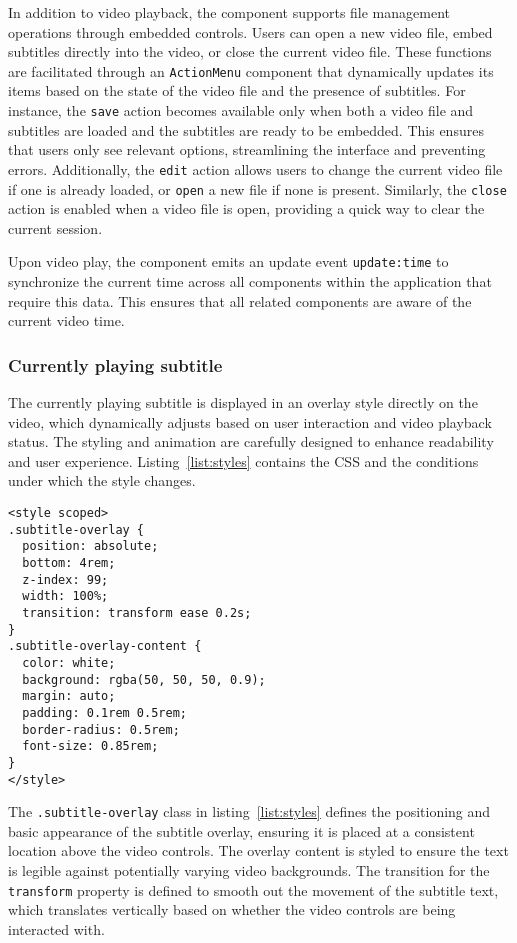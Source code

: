 In addition to video playback, the component supports file management operations through embedded controls. Users can open a new video file, embed subtitles directly into the video, or close the current video file. These functions are facilitated through an \texttt{ActionMenu} component that dynamically updates its items based on the state of the video file and the presence of subtitles. For instance, the \texttt{save} action becomes available only when both a video file and subtitles are loaded and the subtitles are ready to be embedded. This ensures that users only see relevant options, streamlining the interface and preventing errors. Additionally, the \texttt{edit} action allows users to change the current video file if one is already loaded, or \texttt{open} a new file if none is present. Similarly, the \texttt{close} action is enabled when a video file is open, providing a quick way to clear the current session.

Upon video play, the component emits an update event \texttt{update:time} to synchronize the current time across all components within the application that require this data. This ensures that all related components are aware of the current video time.

\subsubsection{Currently playing subtitle}

The currently playing subtitle is displayed in an overlay style directly on the video, which dynamically adjusts based on user interaction and video playback status. The styling and animation are carefully designed to enhance readability and user experience. Listing~\ref{list:styles} contains the CSS and the conditions under which the style changes.

\begin{clisting}
\label{list:styles}
\begin{verbatim}
<style scoped>
.subtitle-overlay {
  position: absolute;
  bottom: 4rem;
  z-index: 99;
  width: 100%;
  transition: transform ease 0.2s;
}
.subtitle-overlay-content {
  color: white;
  background: rgba(50, 50, 50, 0.9);
  margin: auto;
  padding: 0.1rem 0.5rem;
  border-radius: 0.5rem;
  font-size: 0.85rem;
}
</style>
\end{verbatim}
\end{clisting}

The \texttt{.subtitle-overlay} class in listing~\ref{list:styles} defines the positioning and basic appearance of the subtitle overlay, ensuring it is placed at a consistent location above the video controls. The overlay content is styled to ensure the text is legible against potentially varying video backgrounds. The transition for the \texttt{transform} property is defined to smooth out the movement of the subtitle text, which translates vertically based on whether the video controls are being interacted with.


